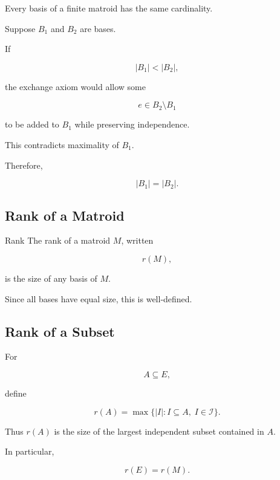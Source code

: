 \begin{theorem}
Every basis of a finite matroid has the same cardinality.
\end{theorem}

Suppose \(B_1\) and \(B_2\) are bases.

If

\[
|B_1|<|B_2|,
\]

the exchange axiom would allow some

\[
e\in B_2\setminus B_1
\]

to be added to \(B_1\) while preserving independence.

This contradicts maximality of \(B_1\).

Therefore,

\[
\boxed{
|B_1|=|B_2|.
}
\]

\subsection{Rank of a Matroid}
\label{subsec:matroid-rank}

\begin{definitionbox}{Rank}
The rank of a matroid \(M\), written

\[
\boxed{
r(M),
}
\]

is the size of any basis of \(M\).
\end{definitionbox}

Since all bases have equal size, this is well-defined.

\subsection{Rank of a Subset}
\label{subsec:rank-of-subset}

For

\[
A\subseteq E,
\]

define

\[
\boxed{
r(A)
=
\max
\{
|I|:
I\subseteq A,\;
I\in\mathcal{I}
\}.
}
\]

Thus \(r(A)\) is the size of the largest independent subset contained
in \(A\).

In particular,

\[
\boxed{
r(E)=r(M).
}
\]

